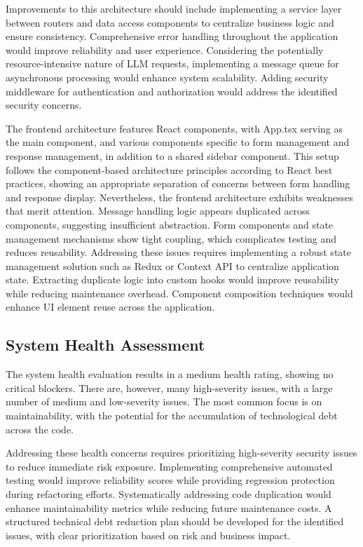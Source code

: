 \documentclass[sigconf]{acmart}
\begin{document}
Improvements to this architecture should include implementing a service layer between routers and data access components to centralize business logic and ensure consistency. Comprehensive error handling throughout the application would improve reliability and user experience. Considering the potentially resource-intensive nature of LLM requests, implementing a message queue for asynchronous processing would enhance system scalability. Adding security middleware for authentication and authorization would address the identified security concerns.

The frontend architecture features React components, with App.tsx serving as the main component, and various components specific to form management and response management, in addition to a shared sidebar component. This setup follows the component-based architecture principles according to React best practices, showing an appropriate separation of concerns between form handling and response display. Nevertheless, the frontend architecture exhibits weaknesses that merit attention. Message handling logic appears duplicated across components, suggesting insufficient abstraction. Form components and state management mechanisms show tight coupling, which complicates testing and reduces reusability. Addressing these issues requires implementing a robust state management solution such as Redux or Context API to centralize application state. Extracting duplicate logic into custom hooks would improve reusability while reducing maintenance overhead. Component composition techniques would enhance UI element reuse across the application.

\subsection{System Health Assessment}
The system health evaluation results in a medium health rating, showing no critical blockers. There are, however, many high-severity issues, with a large number of medium and low-severity issues. The most common focus is on maintainability, with the potential for the accumulation of technological debt across the code.

Addressing these health concerns requires prioritizing high-severity security issues to reduce immediate risk exposure. Implementing comprehensive automated testing would improve reliability scores while providing regression protection during refactoring efforts. Systematically addressing code duplication would enhance maintainability metrics while reducing future maintenance costs. A structured technical debt reduction plan should be developed for the identified issues, with clear prioritization based on risk and business impact.
\end{document}
